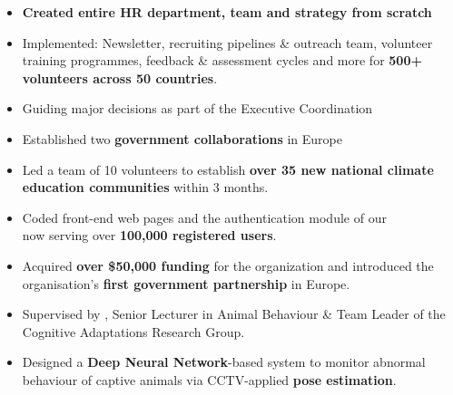 \documentclass[10pt,a4paper,ragged2e,withhyper]{altacv}
\begin{document}
\begin{paracol}{2}


\begin{itemize}
    \item \textbf{Created entire HR department, team and strategy from scratch}
    \item Implemented: Newsletter, recruiting pipelines \& outreach team, volunteer training programmes, feedback \& assessment cycles and more for \textbf{500+ volunteers across 50 countries}.
    \item Guiding major decisions as part of the Executive Coordination
\end{itemize}

\divider

\begin{itemize}
    \item Established two \textbf{government collaborations} in Europe
    \item Led a team of 10 volunteers to establish \textbf{over 35 new national climate education communities} within 3 months.
\end{itemize}

\divider

\begin{itemize}
    \item Coded front-end web pages and the authentication module of our\\  now serving over \textbf{100,000 registered users}.
    \item Acquired \textbf{over \$50,000 funding} for the organization and introduced the organisation's \textbf{first government partnership} in Europe.
\end{itemize}
 

\begin{itemize}
    \item Supervised by , Senior Lecturer in Animal Behaviour \& Team Leader of the Cognitive Adaptations Research Group.
    \item Designed a \textbf{Deep Neural Network}-based system to monitor abnormal behaviour of captive animals via CCTV-applied \textbf{pose estimation}.
\end{itemize}


\end{paracol}
\end{document}
